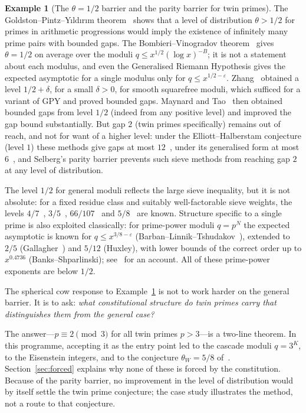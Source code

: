 \documentclass[12pt]{amsart}
\theoremstyle{plain}
\theoremstyle{definition}
\newtheorem{example}[theorem]{Example}
\theoremstyle{remark}
\begin{document}
\begin{example}[The $\theta = 1/2$ barrier and the parity barrier for twin primes]
\label{ex:twinprime-barrier}
The Goldston--Pintz--Y{\i}ld{\i}r{\i}m theorem~\cite{GPY2009} shows that a
level of distribution $\theta > 1/2$ for primes in arithmetic progressions
would imply the existence of infinitely many prime pairs with bounded gaps.
The Bombieri--Vinogradov theorem~\cite{Bombieri1965,Vinogradov1965} gives
$\theta = 1/2$ on average over the moduli $q \leq x^{1/2}(\log x)^{-B}$; it is
not a statement about each modulus, and even the Generalised Riemann Hypothesis
gives the expected asymptotic for a single modulus only for
$q \leq x^{1/2-\varepsilon}$. Zhang~\cite{Zhang2014} obtained a level
$1/2 + \delta$, for a small $\delta > 0$, for smooth squarefree moduli, which
sufficed for a variant of GPY and proved bounded gaps. Maynard and
Tao~\cite{Maynard2015} then obtained bounded gaps from level $1/2$ (indeed from
any positive level) and improved the gap bound substantially. But gap $2$ (twin
primes specifically) remains out of reach, and not for want of a higher level:
under the Elliott--Halberstam conjecture (level $1$) these methods give gaps at
most $12$~\cite{Maynard2015}, under its generalised form at most
$6$~\cite{Polymath8b}, and Selberg's parity barrier prevents such sieve
methods from reaching gap $2$ at any level of distribution.

The level $1/2$ for general moduli reflects the large sieve inequality, but it
is not absolute: for a fixed residue class and suitably well-factorable sieve
weights, the levels $4/7$~\cite{BFI1986}, $3/5$~\cite{Maynard2020},
$66/107$~\cite{Lichtman2023} and $5/8$~\cite{Pascadi2025} are known. Structure
specific to a single prime is also exploited classically: for prime-power moduli
$q = p^N$ the expected asymptotic is known for $q \leq x^{3/8-\varepsilon}$
(Barban--Linnik--Tshudakov~\cite{BLT1964}), extended to $2/5$
(Gallagher~\cite{Gallagher1972}) and $5/12$ (Huxley), with lower bounds of the
correct order up to $x^{0.4736}$ (Banks--Shparlinski); see~\cite{BaierPujahari2022}
for an account. All of these prime-power exponents are below $1/2$.
\end{example}

The spherical cow response to Example~\ref{ex:twinprime-barrier} is not to
work harder on the general barrier. It is to ask: \emph{what constitutional
structure do twin primes carry that distinguishes them from the general case?}

The answer---$p \equiv 2 \pmod{3}$ for all twin primes $p > 3$---is a two-line
theorem. In this programme, accepting it as the entry point led to the cascade
moduli $q = 3^K$, to the Eisenstein integers, and to the conjecture
$\theta_W = 5/8$ of~\cite{WakilEisenstein}. Section~\ref{sec:forced} explains why
none of these is forced by the constitution. Because of the parity barrier, no
improvement in the level of distribution would by itself settle the twin prime
conjecture; the case study illustrates the method, not a route to that
conjecture.
\end{document}
